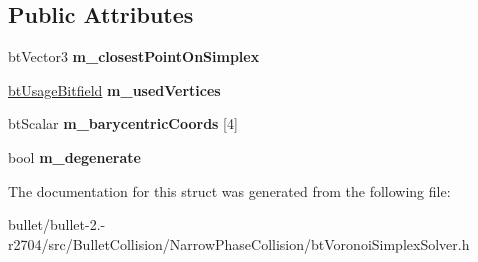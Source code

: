 \subsection*{Public Attributes}
\begin{DoxyCompactItemize}
\item 
\hypertarget{structbt_sub_simplex_closest_result_ae4c08daa4f3ea17aa7c2164f81a63004}{bt\+Vector3 {\bfseries m\+\_\+closest\+Point\+On\+Simplex}}\label{structbt_sub_simplex_closest_result_ae4c08daa4f3ea17aa7c2164f81a63004}

\item 
\hypertarget{structbt_sub_simplex_closest_result_acde7d5b6e96d4f2819e4ad873a97a7a1}{\hyperlink{structbt_usage_bitfield}{bt\+Usage\+Bitfield} {\bfseries m\+\_\+used\+Vertices}}\label{structbt_sub_simplex_closest_result_acde7d5b6e96d4f2819e4ad873a97a7a1}

\item 
\hypertarget{structbt_sub_simplex_closest_result_ad1a56049b87dc8c7a74436553a2ed4d7}{bt\+Scalar {\bfseries m\+\_\+barycentric\+Coords} \mbox{[}4\mbox{]}}\label{structbt_sub_simplex_closest_result_ad1a56049b87dc8c7a74436553a2ed4d7}

\item 
\hypertarget{structbt_sub_simplex_closest_result_a4f1e6160713c73d843a855851557475a}{bool {\bfseries m\+\_\+degenerate}}\label{structbt_sub_simplex_closest_result_a4f1e6160713c73d843a855851557475a}

\end{DoxyCompactItemize}


The documentation for this struct was generated from the following file\+:\begin{DoxyCompactItemize}
\item 
bullet/bullet-\/2.-\/r2704/src/\+Bullet\+Collision/\+Narrow\+Phase\+Collision/bt\+Voronoi\+Simplex\+Solver.\+h\end{DoxyCompactItemize}
